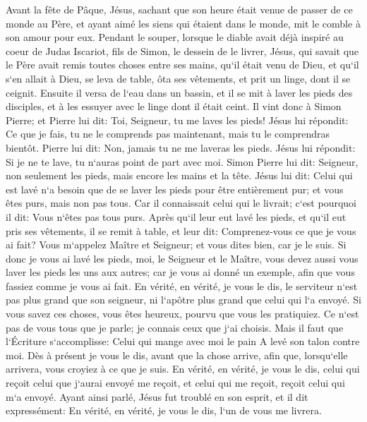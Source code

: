 \verse Avant la fête de Pâque, Jésus, sachant que son heure était venue de passer de ce monde au Père, et ayant aimé les siens qui étaient dans le monde, mit le comble à son amour pour eux. 
\verse Pendant le souper, lorsque le diable avait déjà inspiré au coeur de Judas Iscariot, fils de Simon, le dessein de le livrer, 
\verse Jésus, qui savait que le Père avait remis toutes choses entre ses mains, qu`il était venu de Dieu, et qu`il s`en allait à Dieu, 
\verse se leva de table, ôta ses vêtements, et prit un linge, dont il se ceignit. 
\verse Ensuite il versa de l`eau dans un bassin, et il se mit à laver les pieds des disciples, et à les essuyer avec le linge dont il était ceint. 
\verse Il vint donc à Simon Pierre; et Pierre lui dit: Toi, Seigneur, tu me laves les pieds! 
\verse Jésus lui répondit: Ce que je fais, tu ne le comprends pas maintenant, mais tu le comprendras bientôt. 
\verse Pierre lui dit: Non, jamais tu ne me laveras les pieds. Jésus lui répondit: Si je ne te lave, tu n`auras point de part avec moi. 
\verse Simon Pierre lui dit: Seigneur, non seulement les pieds, mais encore les mains et la tête. 
\verse Jésus lui dit: Celui qui est lavé n`a besoin que de se laver les pieds pour être entièrement pur; et vous êtes purs, mais non pas tous. 
\verse Car il connaissait celui qui le livrait; c`est pourquoi il dit: Vous n`êtes pas tous purs. 
\verse Après qu`il leur eut lavé les pieds, et qu`il eut pris ses vêtements, il se remit à table, et leur dit: Comprenez-vous ce que je vous ai fait? 
\verse Vous m`appelez Maître et Seigneur; et vous dites bien, car je le suis. 
\verse Si donc je vous ai lavé les pieds, moi, le Seigneur et le Maître, vous devez aussi vous laver les pieds les uns aux autres; 
\verse car je vous ai donné un exemple, afin que vous fassiez comme je vous ai fait. 
\verse En vérité, en vérité, je vous le dis, le serviteur n`est pas plus grand que son seigneur, ni l`apôtre plus grand que celui qui l`a envoyé. 
\verse Si vous savez ces choses, vous êtes heureux, pourvu que vous les pratiquiez. 
\verse Ce n`est pas de vous tous que je parle; je connais ceux que j`ai choisis. Mais il faut que l`Écriture s`accomplisse: Celui qui mange avec moi le pain A levé son talon contre moi. 
\verse Dès à présent je vous le dis, avant que la chose arrive, afin que, lorsqu`elle arrivera, vous croyiez à ce que je suis. 
\verse En vérité, en vérité, je vous le dis, celui qui reçoit celui que j`aurai envoyé me reçoit, et celui qui me reçoit, reçoit celui qui m`a envoyé. 
\verse Ayant ainsi parlé, Jésus fut troublé en son esprit, et il dit expressément: En vérité, en vérité, je vous le dis, l`un de vous me livrera. 
